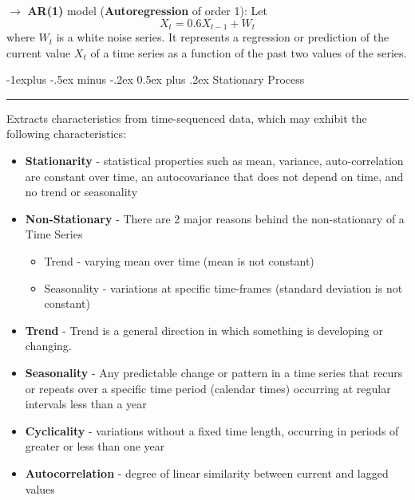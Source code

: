 \documentclass[letterpaper, 10.5pt,landscape]{article}
\makeatletter
\renewcommand{\subsection}{\@startsection{subsection}{2}{0mm}%
                                {-1explus -.5ex minus -.2ex}%
                                {0.5ex plus .2ex}%
                                {\normalfont\normalsize\bfseries}}
\makeatother
\begin{document}
\begin{multicols*}{3}
\vspace{2pt}
$\rightarrow$ \textbf{AR(1)} model (\textbf{Autoregression} of order 1): Let
\vspace{-3pt}
\[X_{t} = 0.6X_{t-1} + W_{t} \]
where $W_{t}$ is a white noise series. It represents a regression or prediction of the current value $X_{t}$ of a time series as a function of the past two values of the series.




\subsection{Stationary Process} {\color{teal}\hrule height 0.5pt} \smallskip








Extracts characteristics from time-sequenced data, which may exhibit the following characteristics:
\begin{itemize}[label={--},leftmargin=4mm]
\vspace{-3pt}
\item \textbf{Stationarity} - statistical properties such as mean, variance, auto-correlation are constant over time, an autocovariance that does not depend on time, and no trend or seasonality
\vspace{-3pt}
\item \textbf{Non-Stationary} - There are 2 major reasons behind the non-stationary of a Time Series 
\vspace{-3pt}
    \begin{itemize}
        \vspace{-3pt}
        \item Trend - varying mean over time (mean is not constant)
        \vspace{-3pt}
        \item Seasonality - variations at specific time-frames (standard deviation is not constant)
    \end{itemize}
    
\item \textbf{Trend} - Trend is a general direction in which something is developing or changing.
\vspace{-3pt}
\item \textbf{Seasonality} - Any predictable change or pattern in a time series that recurs or repeats over a specific time period (calendar times) occurring at regular intervals less than a year
\vspace{-3pt}
\item \textbf{Cyclicality} - variations without a fixed time length, occurring in periods of greater or less than one year
\vspace{-3pt}
\item \textbf{Autocorrelation} - degree of linear similarity between current and lagged values
\end{itemize}



\end{multicols*}
\end{document}
